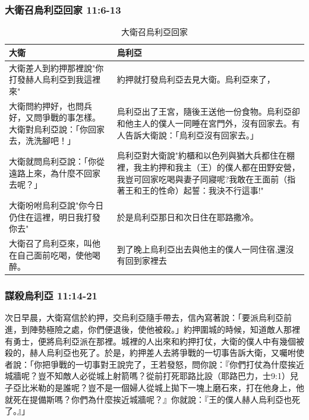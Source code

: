 \subsubsection{大衛召烏利亞回家 11:6-13}
\begin{table}[H]
\hspace*{-7mm}
\centering 
\begin{tabular}{p{8.75cm}|p{9.75cm}}\hline\hline
大衛&烏利亞\\\hline
大衛差人到約押那裡說"你打發赫人烏利亞到我這裡來"
&約押就打發烏利亞去見大衛。烏利亞來了，\\\hline
大衛問約押好，也問兵好，又問爭戰的事怎樣。大衛對烏利亞說：「你回家去，洗洗腳吧！」&烏利亞出了王宮，隨後王送他一份食物。烏利亞卻和他主人的僕人一同睡在宮門外，沒有回家去。有人告訴大衛說：「烏利亞沒有回家去。」\\\hline
大衛就問烏利亞說：「你從遠路上來，為什麼不回家去呢？」&烏利亞對大衛說"約櫃和以色列與猶大兵都住在棚裡，我主約押和我主（王）的僕人都在田野安營，我豈可回家吃喝與妻子同寢呢?我敢在王面前（指著王和王的性命）起誓：我決不行這事!"\\\hline
大衛吩咐烏利亞說"你今日仍住在這裡，明日我打發你去"&於是烏利亞那日和次日住在耶路撒冷。\\\hline
大衛召了烏利亞來，叫他在自己面前吃喝，使他喝醉。&到了晚上烏利亞出去與他主的僕人一同住宿,還沒有回到家裡去\\\hline
\end{tabular}
\caption{大衛召烏利亞回家}
\end{table}

\subsubsection{謀殺烏利亞 11:14-21}
次日早晨，大衛寫信於約押，交烏利亞隨手帶去，信內寫著說：「要派烏利亞前進，到陣勢極險之處，你們便退後，使他被殺。」約押圍城的時候，知道敵人那裡有勇士，便將烏利亞派在那裡。城裡的人出來和約押打仗，大衛的僕人中有幾個被殺的，赫人烏利亞也死了。於是，約押差人去將爭戰的一切事告訴大衛，又囑咐使者說：「你把爭戰的一切事對王說完了，王若發怒，問你說：『你們打仗為什麼挨近城牆呢？豈不知敵人必從城上射箭嗎？從前打死耶路比設（耶路巴力，士9:1）兒子亞比米勒的是誰呢？豈不是一個婦人從城上拋下一塊上磨石來，打在他身上，他就死在提備斯嗎？你們為什麼挨近城牆呢？』你就說：『王的僕人赫人烏利亞也死了。』」

